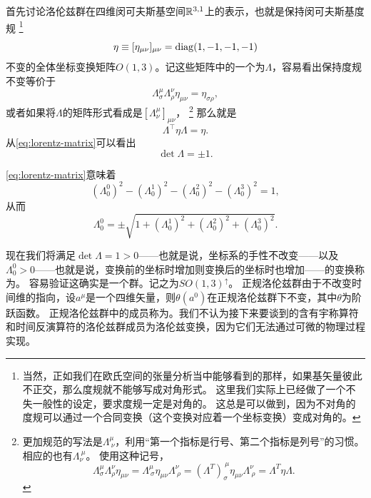 首先讨论洛伦兹群在四维闵可夫斯基空间$\mathbb{R}^{3, 1}$上的表示，也就是保持闵可夫斯基度规%
\footnote{当然，正如我们在欧氏空间的张量分析当中能够看到的那样，如果基矢量彼此不正交，那么度规就不能够写成对角形式。
这里我们实际上已经做了一个不失一般性的设定，要求度规一定是对角的。
这总是可以做到，因为不对角的度规可以通过一个合同变换（这个变换对应着一个坐标变换）变成对角的。}%
\begin{equation}
    \eta \equiv [\eta_{\mu \nu}]_{\mu \nu} = \operatorname{diag} (1, -1, -1, -1)
\end{equation}
不变的全体坐标变换矩阵$O(1,3)$。记这些矩阵中的一个为$\Lambda$，容易看出保持度规不变等价于
\begin{equation}
    \Lambda_\sigma^\mu \Lambda_\rho^\nu \eta_{\mu \nu} = \eta_{\sigma \rho},
\end{equation}
或者如果将$\Lambda$的矩阵形式看成是$[\Lambda^\mu_\nu]_{\mu \nu}$，%
\footnote{更加规范的写法是$\Lambda^\mu_{\ \nu}$，利用“第一个指标是行号、第二个指标是列号”的习惯。相应的也有$\Lambda_{\nu}^{\ \mu}$。
使用这种记号，
\[
    \Lambda_\sigma^\mu \Lambda_\rho^\nu \eta_{\mu \nu} = \Lambda_{\ \sigma}^\mu \eta_{\mu \nu} \Lambda_{\ \rho}^\nu = (\Lambda^T)_\sigma^{\ \mu} \eta_{\mu \nu} \Lambda_{\ \rho}^\nu = \Lambda^T \eta \Lambda.
\]
}%
那么就是
\begin{equation}
    \Lambda^\top \eta \Lambda = \eta.
    \label{eq:lorentz-matrix}
\end{equation}
从\eqref{eq:lorentz-matrix}可以看出
\begin{equation}
    \det \Lambda = \pm 1. 
    \label{eq:det-lorentz}
\end{equation}

\eqref{eq:lorentz-matrix}意味着
\[
    (\Lambda_0^0)^2 - (\Lambda_0^1)^2 - (\Lambda_0^2)^2 - (\Lambda_0^3)^2 = 1,
\]
从而
\begin{equation}
    \Lambda_0^0 = \pm \sqrt{1 + (\Lambda_0^1)^2 + (\Lambda_0^2)^2 + (\Lambda_0^3)^2}.
\end{equation}

现在我们将满足$\det \Lambda = 1 > 0$——也就是说，坐标系的手性不改变——以及$\Lambda_0^0 > 0$——也就是说，变换前的坐标时增加则变换后的坐标时也增加——的变换称为。
容易验证这确实是一个群。记之为$SO(1,3)^\uparrow$。
正规洛伦兹群由于不改变时间维的指向，设$a^\mu$是一个四维矢量，则$\theta(a^0)$在正规洛伦兹群下不变，其中$\theta$为阶跃函数。
正规洛伦兹群中的成员称为。我们不认为接下来要谈到的含有宇称算符和时间反演算符的洛伦兹群成员为洛伦兹变换，因为它们无法通过可微的物理过程实现。

